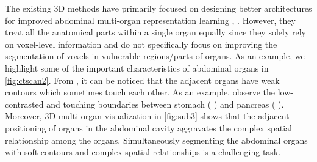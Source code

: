 \documentclass[final,5p,times,twocolumn]{elsarticle}
\begin{document}
The existing 3D methods have primarily focused on designing better architectures for improved abdominal multi-organ representation learning \cite{bobo2018fully}, \cite{gibson2018automatic}. However, they treat all the anatomical parts within a single organ equally since they solely rely on voxel-level information and do not specifically focus on improving the segmentation of voxels in vulnerable regions/parts of organs. As an example, we highlight some of the important characteristics of abdominal organs in \autoref{fig:ctscan2}. From , it can be noticed that the adjacent organs have weak contours which sometimes touch each other. As an example, observe the low-contrasted and touching boundaries between stomach (  ) and pancreas (  ). Moreover, 3D multi-organ visualization in \autoref{fig:sub3} shows that the adjacent positioning of organs in the abdominal cavity aggravates the complex spatial relationship among the organs. Simultaneously segmenting the abdominal organs with soft contours and complex spatial relationships is a challenging task.
\end{document}
